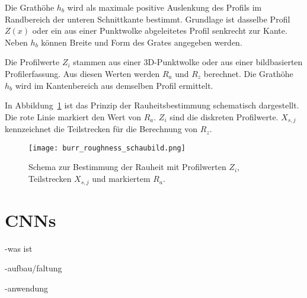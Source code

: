 Die Grathöhe \(h_b\) wird als maximale positive Auslenkung des Profils im Randbereich der unteren Schnittkante bestimmt. Grundlage ist dasselbe Profil \(Z(x)\) oder ein aus einer Punktwolke abgeleitetes Profil senkrecht zur Kante. Neben \(h_b\) können Breite und Form des Grates angegeben werden.

Die Profilwerte \(Z_i\) stammen aus einer 3D-Punktwolke oder aus einer bildbasierten Profilerfassung. Aus diesen Werten werden \(R_a\) und \(R_z\) berechnet. Die Grathöhe \(h_b\) wird im Kantenbereich aus demselben Profil ermittelt.

In Abbildung~\ref{fig:roughness-profile} ist das Prinzip der Rauheitsbestimmung schematisch dargestellt. Die rote Linie markiert den Wert von \(R_a\). \(Z_i\) sind die diskreten Profilwerte. \(X_{s,j}\) kennzeichnet die Teilstrecken für die Berechnung von \(R_z\).

\begin{figure}[htbp]
  \centering
  \texttt{[image: burr\_roughness\_schaubild.png]}
  \caption[Schema zur Bestimmung der Rauheit]{Schema zur Bestimmung der Rauheit mit Profilwerten \(Z_i\), Teilstrecken \(X_{s,j}\) und markiertem \(R_a\).}
  \label{fig:roughness-profile}
\end{figure}



\section{CNNs}
-was ist

-aufbau/faltung

-anwendung